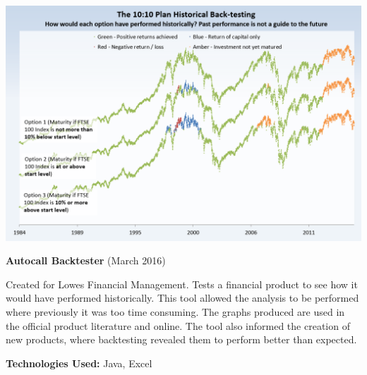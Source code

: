 \documentclass[hidelinks, 12pt, a4paper]{article}
\begin{document}
\begin{minipage}{0.40\textwidth}
		\begin{center}
			\includegraphics[width=0.9\linewidth]{backtest.png}
		\end{center}
		\vspace{-12pt}
		\textbf{Autocall Backtester} (March 2016)
		
		Created for Lowes Financial Management. Tests a financial product to see how it would have performed historically. This tool allowed the analysis to be performed where previously it was too time consuming. The graphs produced are used in the official product literature and online. The tool also informed the creation of new products, where backtesting revealed them to perform better than expected.
		
		\textbf{Technologies Used:} Java, Excel
	\end{minipage}
	\hspace{0.02\textwidth}
	
	
\end{document}
